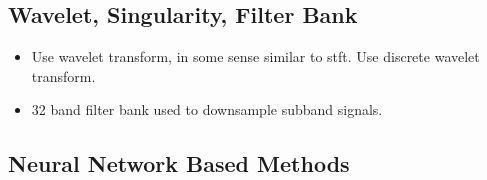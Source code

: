 \documentclass{article}
\begin{document}
\subsection{Wavelet, Singularity, Filter Bank}
\begin{itemize}
\item Use wavelet transform, in some sense similar to stft. Use discrete wavelet transform.
\item 32 band filter bank used to downsample subband signals.
\end{itemize}

\subsection{Neural Network Based Methods}
\end{document}
